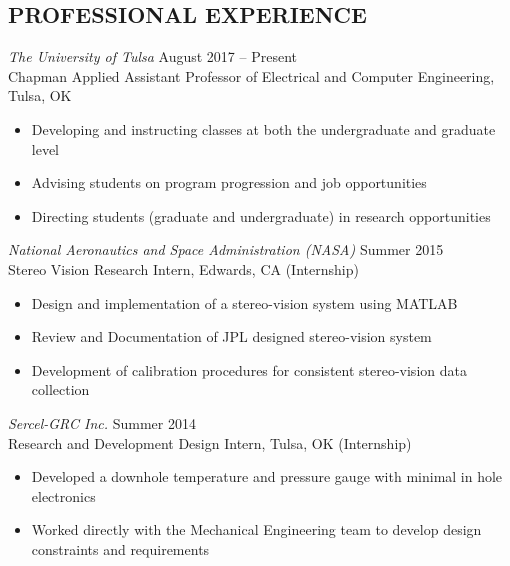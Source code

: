 \documentclass[line]{res} %
\begin{document}
\begin{resume}
\vspace{8pt} %
\vspace{0.2in} %

\section{PROFESSIONAL EXPERIENCE}
\vspace{8pt} %

{\sl The University of Tulsa} \hfill August 2017 -- Present \\
Chapman Applied Assistant Professor of Electrical and Computer Engineering, Tulsa, OK \hfill 
\begin{itemize} \itemsep -2pt %
\item Developing and instructing classes at both the undergraduate and graduate level
\item Advising students on program progression and job opportunities
\item Directing students (graduate and undergraduate) in research opportunities  
\end{itemize}

{\sl National Aeronautics and Space Administration (NASA)} \hfill Summer 2015 \\
Stereo Vision Research Intern, Edwards, CA \hfill (Internship)
\begin{itemize} \itemsep -2pt %
\item Design and implementation of a stereo-vision system using MATLAB
\item Review and Documentation of JPL designed stereo-vision system
\item Development of calibration procedures for consistent stereo-vision data collection
\end{itemize}

{\sl Sercel-GRC Inc.} \hfill Summer 2014 \\
Research and Development Design Intern, Tulsa, OK \hfill (Internship)
\begin{itemize} \itemsep -2pt %
\item Developed a downhole temperature and pressure gauge with minimal in hole electronics
\item Worked directly with the Mechanical Engineering team to develop design constraints and requirements
\end{itemize}


\end{resume}
\end{document}
